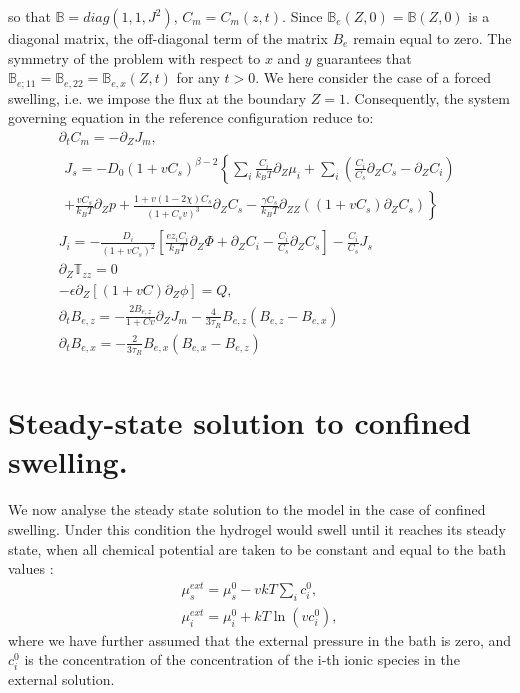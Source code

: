 \documentclass[12pt]{extarticle}
\newcommand{\B}{\ensuremath{\mathbb{B}}}
\begin{document}
so that $\B=diag(1,1,J^2)$, $C_m=C_m(z,t)$. Since $\B_e(Z,0)=\B(Z,0)$ is a diagonal matrix, the off-diagonal term of the matrix $B_e$ remain equal to zero. The symmetry of the problem with respect to $x$ and $y$ guarantees that $\B_{e;11}=\B_{e,22}=\B_{e,x}(Z,t)$ for any $t>0$. We here consider the case of a forced swelling, i.e. we impose the flux at the boundary $Z=1$. Consequently, the system governing equation in the reference configuration reduce to:
\begin{gather}
\partial_t C_m = -\partial_Z J_m,\\
\begin{aligned}
J_s= -D_0 (1+vC_s)^{\beta-2} \left\{\sum_i \frac{C_i}{k_B T}\partial_Z \mu_i + \sum_i \left(\frac{C_i}{C_s}\partial_Z C_s -\partial_Z C_i\right)\right.\\
\left. +\frac{vC_s}{k_BT}\partial_Z p + \frac{1+v(1-2\chi)C_s}{(1+C_sv)^3}\partial_Z C_s - \frac{\gamma C_s}{k_BT}\partial_{ZZ}((1+vC_s)\partial_Z C_s)\right\}
\end{aligned}\\[2mm]
J_i = -\frac{D_i}{(1+vC_s)^2} \left[\frac{ez_iC_i}{k_BT}\partial_Z \Phi +\partial_Z C_i -\frac{C_i}{C_s}\partial_Z C_s\right]-\frac{C_i}{C_s}J_s \\
\partial_Z \mathbb{T}_{zz} = 0 \label{Tgrad}\\
-\epsilon \partial_Z[(1+vC)\partial_Z\phi]=Q,\\
\partial_t B_{e,z} = -\frac{2B_{e,z}}{1+Cv} \partial_Z J_m -\frac{4}{3\tau_R} B_{e,z}(B_{e,z}-B_{e,x})\\
\partial_t B_{e,x} =-\frac{2}{3\tau_R} B_{e,x}(B_{e,x}-B_{e,z})\\
\end{gather}

\section{Steady-state solution to confined swelling.}

We now analyse the steady state solution to the model in the case of confined swelling. Under this condition the hydrogel would swell until it reaches its steady state, when all chemical potential are taken to be constant and equal to the bath values \cite{swell2}:
\begin{eqnarray}
\mu^{ext}_s = \mu^0_s - vkT \sum_i c^0_i,\\
\mu^{ext}_i = \mu^0_i +kT\ln(vc^0_i),
\end{eqnarray}
where we have further assumed that the external pressure in the bath is zero, and $c^0_i$ is the concentration of the concentration of the i-th ionic species in the external solution.
\end{document}
